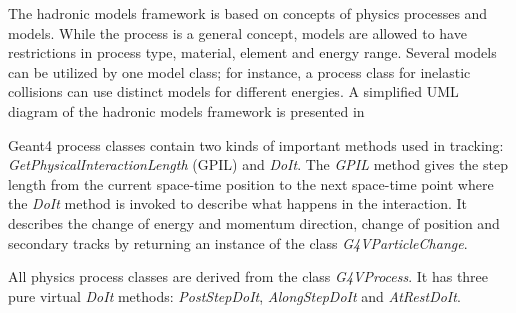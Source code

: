 The hadronic models framework is based on concepts of physics
processes and models. While the process is a general concept, models
are allowed to have restrictions in process type, material, element
and energy range.  Several models can be utilized by one model class; for instance, a
process class for inelastic collisions can use distinct models for different energies.
A simplified UML
diagram of the hadronic models framework is presented in


Geant4 process classes contain two kinds of important methods used in
tracking: {\it GetPhysicalInteractionLength} (GPIL) and {\it
  DoIt}.  The {\it GPIL} method gives the step length from the current
space-time position to the next space-time point where the {\it DoIt}
method is invoked to describe what happens in the interaction.  It
describes the change of energy and momentum direction, change of
position and secondary tracks by returning an instance of the class {\it G4VParticleChange}.

All physics process classes are derived from the class {\it G4VProcess}. It
has three pure virtual {\it DoIt} methods: {\it PostStepDoIt},
{\it AlongStepDoIt} and {\it AtRestDoIt}.


